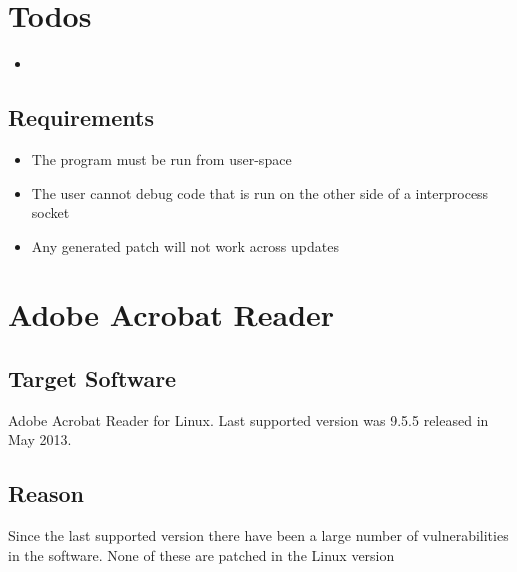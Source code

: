 \maketitle

\section{Todos}
\begin{itemize}
  \item 
{}
\end{itemize}
\begin{itemize}
  
\end{itemize}

\subsection{Requirements}
\begin{itemize}
  \item The program must be run from user-space
  \item The user cannot debug code that is run on the other side of a interprocess socket
  \item Any generated patch will not work across updates
\end{itemize}

\section{Adobe Acrobat Reader}
\subsection{Target Software}
Adobe Acrobat Reader for Linux. Last supported version was 9.5.5 released in May 2013. 
\subsection{Reason}
Since the last supported version there have been a large number of vulnerabilities in the software. None of these are patched in the Linux version

